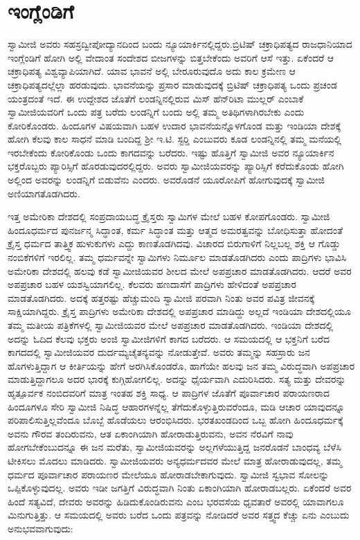 
\chapter{ಇಂಗ್ಲೆಂಡಿಗೆ}

 ಸ್ವಾಮೀಜಿ ಅವರು ಸಹಸ್ರದ್ವೀಪೋದ್ಯಾನದಿಂದ ಬಂದು ನ್ಯೂಯಾರ್ಕಿನಲ್ಲಿದ್ದರು.\break ಬ್ರಿಟಿಷ್ ಚಕ್ರಾಧಿಪತ್ಯದ ರಾಜಧಾನಿಯಾದ ಇಂಗ್ಲೆಂಡಿಗೆ ಹೋಗಿ ಅಲ್ಲಿ ವೇದಾಂತ ಸಂದೇಶದ ಬೀಜಗಳನ್ನು ಬಿತ್ತಬೇಕೆಂದು ಅವರಿಗೆ ಆಸೆ ಇತ್ತು. ಏಕೆಂದರೆ ಆ ಚಕ್ರಾಧಿಪತ್ಯ ವಿಶ್ವವ್ಯಾಪಿಯಾಗಿದೆ. ಯಾವ ಭಾವನೆ ಅಲ್ಲಿ ಬೇರೂರುವುದೊ ಅದು ಕಾಲ ಕ್ರಮೇಣ ಆ ಚಕ್ರಾಧಿಪತ್ಯದಲ್ಲೆಲ್ಲಾ ಹರಡುವುದು. ಭಾವನೆಯನ್ನು ಪ್ರಸಾರ ಮಾಡುವುದಕ್ಕೆ ಬ್ರಿಟಿಷ್ ಚಕ್ರಾಧಿಪತ್ಯ ಒಂದು ಪ್ರಚಂಡ ಯಂತ್ರದಂತೆ ಇದೆ. ಈ ಉದ್ದೇಶದ ಜೊತೆಗೆ ಲಂಡನ್ನಿನಲ್ಲಿರುವ ಮಿಸ್ ಹೆನ್‍ರಿಟಾ ಮುಲ್ಲರ್ ಎಂಬಾಕೆ ಸ್ವಾಮೀಜಿಯವರಿಗೆ ಒಂದು ಪತ್ರ ಬರೆದು ಲಂಡನ್ನಿಗೆ ಬಂದು ಅಲ್ಲಿ ತಮ್ಮ ಅತಿಥಿಗಳಾಗಿರಬೇಕು ಎಂದು ಕೋರಿಕೊಂಡರು. ಹಿಂದೂಗಳ ವಿಷಯವಾಗಿ ಬಹಳ ಉದಾರ ಭಾವನೆಯನ್ನೊಳಗೊಂಡ ಮತ್ತು ಇಂಡಿಯಾ ದೇಶಕ್ಕೆ ಹೋಗಿ ಕೆಲವು ಕಾಲ ಸಾಧನೆ ಮಾಡಿ ಬಂದಿದ್ದ ಶ‍್ರೀ ಇ.ಟಿ. ಸ್ಟರ‍್ಡಿ ಎಂಬುವರು ಕೂಡ ಲಂಡನ್ನಿನಲ್ಲಿ ತಮ್ಮ ಮನೆಯಲ್ಲಿ ಇರಬೇಕೆಂದು ಕೋರಿಕೊಂಡು ಒಂದು ಕಾಗದವನ್ನು ಬರೆದರು. ಇಷ್ಟು ಹೊತ್ತಿಗೆ ಸ್ವಾಮೀಜಿ ಅವರ ನ್ಯೂಯಾರ್ಕಿನ ಭಕ್ತರೊಬ್ಬರು ಪ್ಯಾರಿಸ್ಸಿಗೆ ಹೊರಡುವುದರಲ್ಲಿದ್ದರು. ಅವರು ಸ್ವಾಮೀಜಿಯವರನ್ನು ಪ್ಯಾರಿಸ್ಸಿಗೆ ಕರೆದುಕೊಂಡು ಹೋಗಿ ಅಲ್ಲಿಂದ ಅವರನ್ನು ಲಂಡನ್ನಿಗೆ ಬಿಡುವೆನು ಎಂದರು. ಅವರೊಡನೆ ಯೂರೋಪಿಗೆ ಹೋಗುವುದಕ್ಕೆ ಸ್ವಾಮೀಜಿ ಅಣಿಯಾಗತೊಡಗಿದರು. 

 ಇತ್ತ ಅಮೇರಿಕಾ ದೇಶದಲ್ಲಿ ಸಂಪ್ರದಾಯಬದ್ಧ ಕ್ರೈಸ್ತರು ಸ್ವಾಮಿಗಳ ಮೇಲೆ ಬಹಳ ಕೋಪಗೊಂಡರು. ಸ್ವಾಮೀಜಿ ಹಿಂದೂಧರ್ಮದ ಪುನರ್ಜನ್ಮ ಸಿದ್ಧಾಂತ, ಕರ್ಮ ಸಿದ್ಧಾಂತ ಮತ್ತು ಆತ್ಮದ ಅಮರತ್ವವನ್ನು ಬೋಧಿಸುತ್ತಾ ಹೋದಂತೆ ಕ್ರೈಸ್ತ ಧರ್ಮದ ತಾತ್ತ್ವಿಕ ಹುಳುಕುಗಳು ಎದ್ದು ಕಾಣತೊಡಗಿದವು. ವಿಚಾರದ ಬಿರುಗಾಳಿಗೆ ನಿಲ್ಲಬಲ್ಲ ಶಕ್ತಿ ಆ ಗೊಡ್ಡು ನಂಬಿಕೆಗಳಿಗೆ ಇರಲಿಲ್ಲ. ತಮ್ಮ ಧರ್ಮವನ್ನೇ ಸ್ವಾಮಿಗಳು ನಿರ್ಮೂಲ ಮಾಡತೊಡಗಿದರು ಎಂದು ಪಾದ್ರಿಗಳು ಭಾವಿಸಿ ಅಮೇರಿಕಾ ದೇಶದಲ್ಲಿ ಹಲವು ಕಡೆ ಸ್ವಾಮೀಜಿಯವರ ಶೀಲದ ಮೇಲೆ ಅಪಪ್ರಚಾರ ಮಾಡತೊಡಗಿದರು. ಆದರೆ ಅವರ ಅಪಪ್ರಚಾರ ಬಹಳ ಯಶಸ್ವಿಯಾಗಲಿಲ್ಲ. ಕೆಲವರು ಹಣದಾಸೆಗೆ ಪಾದ್ರಿಗಳು ಹೇಳಿದಂತೆ ಅಪಪ್ರಚಾರ ಮಾಡತೊಡಗಿದರು. ಅದಕ್ಕೆ ಹತ್ತರಷ್ಟು ಹೆಚ್ಚುಮಂದಿ ಸ್ವಾಮೀಜಿ ಪರವಾಗಿ ನಿಂತು ಅವರ ಪವಿತ್ರ ಜೀವನಕ್ಕೆ ಸಾಕ್ಷಿಯಾಗಿದ್ದರು. ಕ್ರೈಸ್ತ ಪಾದ್ರಿಗಳು ಅಮೇರಿಕಾ ದೇಶದಲ್ಲಿ ಅಪಪ್ರಚಾರ ಮಾಡಿದ್ದು ಅಲ್ಲದೆ ಇಂಡಿಯಾ ದೇಶದಲ್ಲಿಯೂ ತಮ್ಮ ಮತೀಯ ಪತ್ರಿಕೆಗಳಲ್ಲಿ ಸ್ವಾಮೀಜಿಯವರ ಮೇಲೆ ಅಪಪ್ರಚಾರ ಮಾಡತೊಡಗಿದರು. ಇಂಡಿಯಾ ದೇಶದಲ್ಲಿ ಅದನ್ನು ಓದಿದ ಕೆಲವು ಭಕ್ತರು ಅಂಜಿ ಸ್ವಾಮೀಜಿಗಳಿಗೆ ಕಾಗದ ಬರೆದರು. ಆ ಸಮಯದಲ್ಲಿ ಆ ಭಕ್ತನಿಗೆ ಬರೆದ ಕಾಗದದಲ್ಲಿ ಸ್ವಾಮೀಜಿಯವರ ದುರ್ದಮ್ಯ\break ಚೈತನ್ಯವನ್ನು ನೋಡುತ್ತೇವೆ. ಅವರು ತಮ್ಮನ್ನು ಸಹಸ್ರಾರು ಜನ ಹೊಗಳುತ್ತಿದ್ದಾಗ ಆ ಕೀರ್ತಿಯನ್ನು ಹೇಗೆ ಅರಗಿಸಿಕೊಂಡರೊ, ಹಾಗೆಯೇ ಹಲವು ಜನ ತಮ್ಮ ವಿರುದ್ಧವಾಗಿ ಅಪಪ್ರಚಾರ ಮಾಡುತ್ತಿದ್ದಾಗಲೂ ಅದರ ಭಾರಕ್ಕೆ ಕುಗ್ಗಿಹೋಗಲಿಲ್ಲ. ಅದನ್ನು ಧೈರ್ಯವಾಗಿ ಎದುರಿಸಿದರು. ಸತ್ಯ ಮತ್ತು ದೇವರನ್ನು ಹೃತ್ಪೂರ್ವಕ ನಂಬಿದವರಿಗೆ ಮಾತ್ರ ಇಂತಹ ಶಕ್ತಿ ಸಾಧ್ಯ. ಆ ಪಾದ್ರಿಗಳ ಜೊತೆಗೆ ಪೂರ್ವಾಚಾರ ಪರಾಯಣರಾದ ಹಿಂದೂಗಳೂ ಸೇರಿ ಸ್ವಾಮೀಜಿ ನಿಷಿದ್ಧ ಆಹಾರಗಳನ್ನೆಲ್ಲ ತೆಗೆದುಕೊಳ್ಳುತ್ತಿರುವರೆಂದೂ, ಮಡಿ ಆಚಾರ ಯಾವುದನ್ನೂ ಪರಿಪಾಲಿಸುತ್ತಿಲ್ಲವೆಂದೂ ಬೊಬ್ಬೆ ಹೊಡೆಯಲು ಆರಂಭಿಸಿದರು. ಭರತಖಂಡದಿಂದ ಒಬ್ಬ ಹೋಗಿ ಹಿಂದೂಧರ್ಮಕ್ಕೆ ಅವನು ಗೌರವ ತಂದಿರುವನು, ಆತ ಏಕಾಂಗಿಯಾಗಿ ಹೋರಾಡುತ್ತಿರುವನು, ಅವನ ನೆರವಿಗೆ ನಾವು ಹೋಗಬೇಕೆಂಬುದನ್ನೂ ಈ ಜನ ಮರೆತು, ಸ್ವಾಮೀಜಿಯವರನ್ನು ಅಲ್ಲಗಳೆಯುತ್ತಿದ್ದ ಜನರೊಡನೆ ಬಾಂಧವ್ಯ ಬೆಳೆಸಿ ಟೀಕಿಸಲು ಮೊದಲು ಮಾಡಿದರು. ಸ್ವಾಮೀಜಿಯವರು ಅನ್ಯಧರ್ಮದವರ ಮೇಲೆ ಮಾತ್ರ ಹೋರಾಡುವುದಲ್ಲ, ತಮ್ಮ ಧರ್ಮದ ಪೂರ್ವಾಚಾರ ಪರಾಯಣರ ಮೇಲೆಯೂ ಹೋರಾಡಬೇಕಾಗುವುದು. ಸ್ವಾಮೀಜಿ ಸ್ವಭಾವ ಸೋಲನ್ನು ಒಪ್ಪಿಕೊಳ್ಳುವುದಲ್ಲ. ಅವರು ಇಡೀ ಜಗತ್ತಿಗೆ ವಿರುದ್ಧವಾಗಿ ನಿಂತು ಏಕಾಂಗಿಯಾಗಿ ಹೋರಾಡಬಲ್ಲರು. ಏಕೆಂದರೆ ಅವರ ಹಿಂದೆ ಸತ್ಯವಿದೆ, ದೇವರು ಅವರನ್ನು ಹಿಡಿದುಕೊಂಡಿರುವನು ಎಂಬ ಭರವಸೆಯ ಧೃವತಾರೆ ಅವರಲ್ಲಿ ಯಾವಾಗಲೂ ಮಿನುಗುತ್ತಿತ್ತು. ಆ ಸಮಯದಲ್ಲಿ ಅವರು ಬರೆದ ಒಂದು ಪತ್ರವನ್ನು ನೋಡಿದರೆ ಅವರ ಸತ್ತ್ವದ ಕೆಚ್ಚು ಏನು ಎಂಬುದು ಅನುಭವವಾಗುವುದು: 

